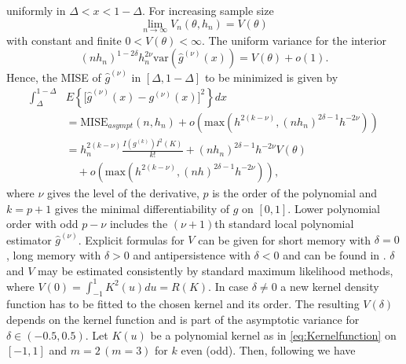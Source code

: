 \documentclass[12pt]{article}
\begin{document}
uniformly in \(\Delta < x < 1-\Delta \). For increasing sample size
\begin{equation}
\label{eq:VarianceN}
\lim_{n \rightarrow \infty} V_n(\theta,h_n) = V(\theta)
\end{equation}
with constant and finite \(0 < V(\theta) < \infty\).
The uniform variance for the interior 
\begin{equation}
\label{VarianceU}
(n h_n)^{1-2\delta} h_n^{2\nu} \text{var}(\hat{g}^{(\nu)}(x)) = V(\theta) + o(1).
\end{equation}
Hence, the MISE of \( \hat{g}^{(\nu)} \) in \( [\Delta,1-\Delta] \) to be minimized is given by
\begin{equation}
\label{eq:MISE}
\begin{split}
\int_{\Delta}^{1-\Delta} & E\left\lbrace \big[\hat{g}^{(\nu)}(x) - g^{(\nu)}(x) \big]^{2} \right\rbrace dx \\
& = \text{MISE}_{asympt}(n,h_{n}) +  o(\text{max}(h^{2(k-\nu)},(nh_{n})^{2\delta-1} h^{-2\nu})) \\
& = h_n^{2(k-\nu)} \frac{I(g^{(k)})I^{2}(K)}{k!} + (nh_{n})^{2\delta-1} h^{-2\nu} V(\theta) \\
& \quad + o(\text{max}(h^{2(k-\nu)},(nh)^{2\delta-1} h^{-2\nu})),
\end{split} 
\end{equation}
where \( \nu \) gives the level of the derivative, \(p\) is the order of the polynomial and \(k = p + 1\) gives the minimal differentiability of \(g\) on \([0,1]\). Lower polynomial order with odd \(p - \nu \) includes the \((\nu + 1)\)th standard local polynomial estimator  \(\hat{g}^{(\nu)}\).
Explicit formulas for \(V\) can be given for short memory with \( \delta = 0 \), long memory with \( \delta > 0 \) and antipersistence with \( \delta < 0 \) and can be found in \textcite{hall1990nonparametric,beran2002iterative}. 
\( \delta \) and \(V\) may be estimated consistently by standard maximum likelihood methods, where \(V(0) = \int_{-1}^{1} K^{2}(u)du = R(K)\).
In case \( \delta \neq 0 \) a new kernel density function has to be fitted to the chosen kernel and its order. The resulting \(V(\delta)\) depends on the kernel function and is part of the asymptotic variance for \( \delta \in (-0.5,0.5) \). Let \(K(u)\) be a polynomial kernel as in \eqref{eq:Kernelfunction} on \( [-1,1] \) and \(m = 2\, (m=3)\) for \(k\) even (odd). Then, following \textcite{feng2003kernel} we have
\end{document}
